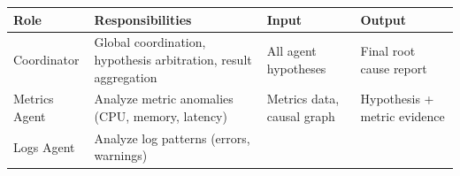 \begin{longtable}[]{@{}llll@{}}
\toprule
\begin{minipage}[b]{0.14\columnwidth}\raggedright
Role\strut
\end{minipage} & \begin{minipage}[b]{0.41\columnwidth}\raggedright
Responsibilities\strut
\end{minipage} & \begin{minipage}[b]{0.16\columnwidth}\raggedright
Input\strut
\end{minipage} & \begin{minipage}[b]{0.18\columnwidth}\raggedright
Output\strut
\end{minipage}\tabularnewline
\midrule
\endhead
\begin{minipage}[t]{0.14\columnwidth}\raggedright
Coordinator\strut
\end{minipage} & \begin{minipage}[t]{0.41\columnwidth}\raggedright
Global coordination, hypothesis arbitration, result aggregation\strut
\end{minipage} & \begin{minipage}[t]{0.16\columnwidth}\raggedright
All agent hypotheses\strut
\end{minipage} & \begin{minipage}[t]{0.18\columnwidth}\raggedright
Final root cause report\strut
\end{minipage}\tabularnewline
\begin{minipage}[t]{0.14\columnwidth}\raggedright
Metrics Agent\strut
\end{minipage} & \begin{minipage}[t]{0.41\columnwidth}\raggedright
Analyze metric anomalies (CPU, memory, latency)\strut
\end{minipage} & \begin{minipage}[t]{0.16\columnwidth}\raggedright
Metrics data, causal graph\strut
\end{minipage} & \begin{minipage}[t]{0.18\columnwidth}\raggedright
Hypothesis + metric evidence\strut
\end{minipage}\tabularnewline
\begin{minipage}[t]{0.14\columnwidth}\raggedright
Logs Agent\strut
\end{minipage} & \begin{minipage}[t]{0.41\columnwidth}\raggedright
Analyze log patterns (errors, warnings)\strut
\end{minipage} & \begin{minipage}[t]{0.16\columnwidth}\raggedright

\end{minipage}
\end{longtable}
